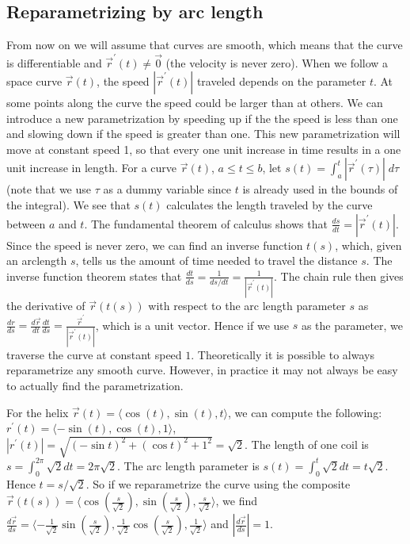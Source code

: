 \subsection{Reparametrizing by arc length}
From now on we will assume that curves are smooth, which means that
the curve is differentiable and $\vec r^\prime(t)\neq \vec 0$ (the velocity is
never zero).  When we follow a space curve $\vec r(t)$, the speed
$|\vec r^\prime(t)|$ traveled depends on the parameter {$t$}. At some
points along the curve the speed could be larger than at others.  We
can introduce a new parametrization by speeding up if the the speed is
less than one and slowing down if the speed is greater than one. This
new parametrization will move at constant speed 1, so that every one
unit increase in time results in a one unit increase in length. For a
curve $\vec r(t)$, $a\leq t\leq b$, let $s(t)=\int_a^t|\vec r^\prime(\tau)|\;d\tau$ (note
that we use {$ \tau $} as a dummy variable since $t$ is already used in
the bounds of the integral). We see that $s(t)$ calculates the length
traveled by the curve between $a$ and $t$.  The fundamental theorem of
calculus shows that $\frac{ds}{dt} = |\vec r^\prime(t)|$. Since the speed
is never zero, we can find an inverse function $t(s)$, which, given an
arclength $s$, tells us the amount of time needed to travel the
distance $s$. The inverse function theorem states that $\frac{dt}{ds}
= \frac{1}{ds/dt} = \frac{1}{| \vec r^\prime(t)|}$. The chain rule then
gives the derivative of $\vec r(t(s))$ with respect to the arc length
parameter $s$ as $\frac{dr}{ds} = \frac{d\vec r}{dt}\frac{dt}{ds} =
\frac{\vec r^\prime}{|\vec r^\prime(t)|}$, which is a unit vector. Hence if we
use $s$ as the parameter, we traverse the curve at constant speed $1$.
Theoretically it is possible to always reparametrize any smooth curve.
However, in practice it may not always be easy to actually find the
parametrization.

For the helix $ \vec r(t)=\langle\cos(t),\sin(t),t\rangle $, we can compute the
following: $r^\prime(t) =\langle-\sin(t),\cos(t),1\rangle$, $|r^\prime(t)| = \sqrt{(-\sin
t)^2+(\cos t)^2+1^2}=\sqrt{2}$. The length of one coil is $s =
\int_0^{2\pi}\sqrt{2}dt = 2\pi\sqrt 2$. The arc length parameter is $s(t) =
\int_0^{t}\sqrt{2}dt = t\sqrt{2}$.  Hence $t=s/\sqrt{2}$.  So if we
reparametrize the curve using the composite $\vec r(t(s)) = 
\langle\cos(\frac{s}{\sqrt 2}),\sin(\frac{s}{\sqrt 2}),\frac{s}{\sqrt 2}\rangle $,
we find $\frac{d\vec r}{ds} = \langle-\frac{1}{\sqrt{2}}\sin(\frac{s}{\sqrt
2}),\frac{1}{\sqrt{2}}\cos(\frac{s}{\sqrt 2}),\frac{1}{\sqrt 2}\rangle $ and
$\left|\frac{d\vec r}{ds}\right|=1$. 



